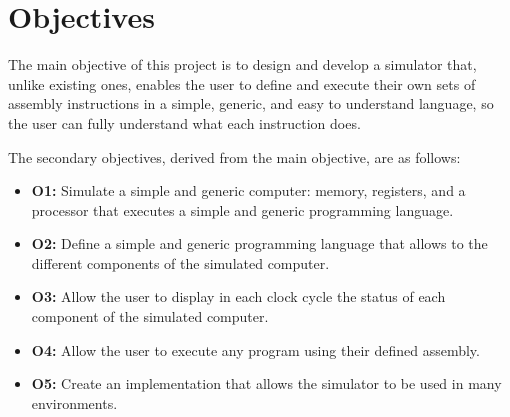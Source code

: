 \section{Objectives}\label{sec:objectives}
The main objective of this project is to design and develop a simulator that, unlike existing ones, enables the user to define and execute their own sets of \gls{assembly} instructions in a simple, generic, and easy to understand language, so the user can fully understand what each instruction does.

\noindent
The secondary objectives, derived from the main objective, are as follows:
\begin{itemize}
  \item \textbf{O1:} Simulate a simple and generic \gls{computer}: \gls{memory}, \glspl{register}, and a \gls{processor} that executes a simple and generic \gls{programming language}.
  \item \textbf{O2:} Define a simple and generic \gls{programming language} that allows to  the different components of the simulated \gls{computer}.
  \item \textbf{O3:} Allow the user to display in each \gls{clock cycle} the status of each component of the simulated
  \gls{computer}.
  \item \textbf{O4:} Allow the user to execute any program using their defined \gls{assembly}.
  \item \textbf{O5:} Create an implementation that allows the simulator to be used in many environments.
\end{itemize}


